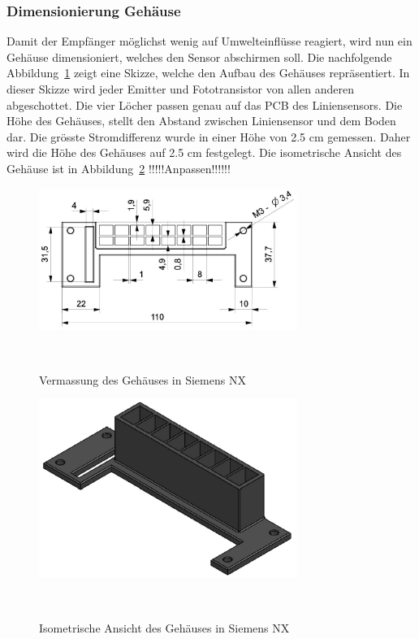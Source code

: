 \documentclass[main.tex]{subfiles} %
\begin{document}
\subsubsection*{Dimensionierung Gehäuse}
Damit der Empfänger möglichst wenig auf Umwelteinflüsse reagiert, wird nun ein 
Gehäuse dimensioniert, welches den Sensor abschirmen soll. Die nachfolgende 
Abbildung~\ref{fig:Gehaeuse_Vermasst} zeigt eine Skizze, welche den Aufbau des Gehäuses repräsentiert.
In dieser Skizze wird jeder Emitter und Fototransistor von allen anderen abgeschottet. Die vier Löcher
passen genau auf das PCB des Liniensensors. Die Höhe des Gehäuses, stellt den Abstand zwischen Liniensensor
und dem Boden dar. Die grösste Stromdifferenz wurde in einer Höhe von 2.5 cm gemessen. Daher wird die Höhe
des Gehäuses auf 2.5 cm festgelegt.
Die isometrische Ansicht des Gehäuse ist in Abbildung~\ref{fig:Gehaeuse_Isometrisch} !!!!!Anpassen!!!!!!

\begin{figure}[H]
    \centering
    \includegraphics[width=0.75\textwidth]{./fig_Liniensensor/Gehaeuse_Vermasst.pdf}
    \caption{Vermassung des Gehäuses in Siemens NX}~\label{fig:Gehaeuse_Vermasst}
\end{figure}

\begin{figure}[H]
    \centering
    \includegraphics[width=0.75\textwidth]{./fig_Liniensensor/Gehaeuse_Isometrisch.pdf}
    \caption{Isometrische Ansicht des Gehäuses in Siemens NX}~\label{fig:Gehaeuse_Isometrisch}
\end{figure}
\end{document}
